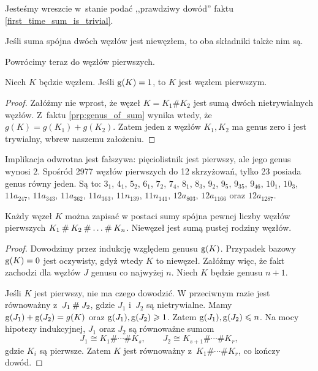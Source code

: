 Jesteśmy wreszcie w~stanie podać ,,prawdziwy dowód'' faktu \ref{first_time_sum_is_trivial}.

\begin{corollary}
\label{cor:connected_sum_no_inverses}%
    Jeśli suma spójna dwóch węzłów jest niewęzłem, to oba składniki także nim są.
\end{corollary}

Powrócimy teraz do węzłów pierwszych.
%

\begin{proposition}
    Niech $K$ będzie węzłem.
    Jeśli $\operatorname{g} (K) = 1$, to $K$ jest węzłem pierwszym.
\end{proposition}

\begin{proof}
    Załóżmy nie wprost, że węzeł $K = K_1 \# K_2$ jest sumą dwóch nietrywialnych węzłów.
    Z~faktu \ref{prp:genus_of_sum} wynika wtedy, że $g(K) = g(K_1) + g(K_2)$.
    Zatem jeden z węzłów $K_1, K_2$ ma genus zero i jest trywialny, wbrew naszemu założeniu.
\end{proof}

Implikacja odwrotna jest fałszywa: pięciolistnik jest pierwszy, ale jego genus wynosi $2$.
Spośród 2977 węzłów pierwszych do 12 skrzyżowań, tylko 23 posiada genus równy jeden.
Są to: $3_{1}$, $4_{1}$, $5_{2}$, $6_{1}$, $7_{2}$, $7_{4}$, $8_{1}$, $8_{3}$, $9_{2}$, $9_{5}$, $9_{35}$, $9_{46}$, $10_{1}$, $10_{3}$, $11a_{247}$, $11a_{343}$, $11a_{362}$, $11a_{363}$, $11n_{139}$, $11n_{141}$, $12a_{803}$, $12a_{1166}$ oraz $12a_{1287}$.

\begin{proposition}
\label{prp:knots_decompose_into_primes}%
    Każdy węzeł $K$ można zapisać w postaci sumy spójna pewnej liczby węzłów pierwszych $K_1 \mathbin{\#} K_2 \mathbin{\#} \ldots \mathbin{\#} K_n$.
    Niewęzeł jest sumą pustej rodziny węzłów.
\end{proposition}

\begin{proof}
    Dowodzimy przez indukcję względem genusu $\operatorname{g} (K)$.
    Przypadek bazowy $\operatorname{g} (K) = 0$ jest oczywisty, gdyż wtedy $K$ to niewęzeł.
    Załóżmy więc, że fakt zachodzi dla węzłów $J$ genusu co najwyżej $n$.
    Niech $K$ będzie genusu $n + 1$.

    Jeśli $K$ jest pierwszy, nie ma czego dowodzić.
    W przeciwnym razie jest równoważny z~$J_1 \mathbin{\#} J_2$, gdzie $J_1$ i~$J_2$ są nietrywialne.
    Mamy $\operatorname{g} (J_1) + \operatorname{g} (J_2) = g(K)$ oraz $\operatorname{g}(J_1), \operatorname{g}(J_2) \geqslant 1$.
    Zatem $\operatorname{g}(J_1), \operatorname{g}(J_2) \leqslant n$.
    Na mocy hipotezy indukcyjnej, $J_1$ oraz $J_2$ są równoważne sumom
    \[
        J_1 \cong K_1 \# \cdots \# K_s, \qquad
        J_2 \cong K_{s+1} \# \cdots \# K_r,
    \]
    gdzie $K_i$ są pierwsze.
    Zatem $K$ jest równoważny z~$K_1\#\cdots\# K_r$, co kończy dowód.
\end{proof}

